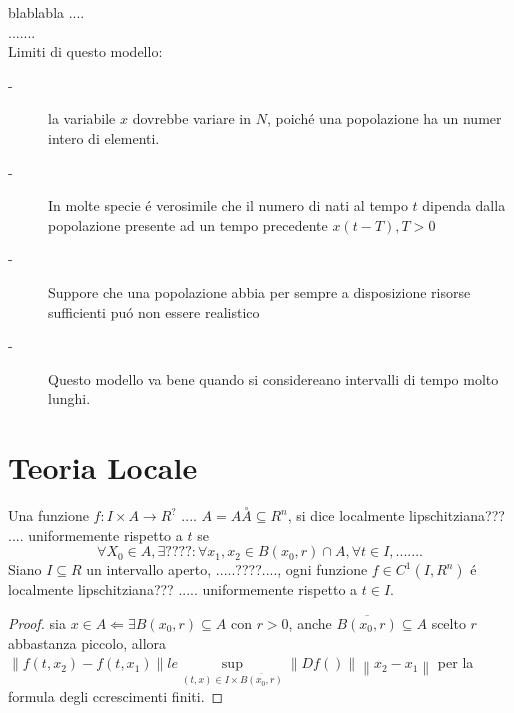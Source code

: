 blablabla ....\\
.......\\
Limiti di questo modello:
\begin{description}
	\item[-] la variabile $x$ dovrebbe variare in $N$, poich\'e una popolazione ha un numer intero di elementi.
	\item[-] In molte specie \'e verosimile che il numero di nati al tempo $t$ dipenda dalla popolazione presente ad un tempo precedente $x(t-T), T>0$
	\item[-] Suppore che una popolazione abbia per sempre a disposizione risorse sufficienti pu\'o non essere realistico
	\item[-] Questo modello va bene quando si considereano intervalli di tempo molto lunghi.
\end{description}

\section{Teoria Locale}
 Una funzione $f:I\times A\to R^{?}$ .... $A=A\overset{\circ}{A}\subseteq R^n$, si dice localmente lipschitziana??? .... uniformemente rispetto a $t$ se $$\forall X_0 \in A, \exists ???? : \forall x_1,x_2 \in B(x_0,r)\cap A, \forall t\in I, .......$$
\proposition
Siano $I\subseteq R$ un intervallo aperto, .....????...., ogni funzione $f\in C^1(I,R^n)$ \'e localmente lipschitziana??? ..... uniformemente rispetto a $t\in I$.
\begin{proof}
	sia $x\in A \Leftarrow \exists B(x_0,r)\subseteq A$ con $r>0$, anche $\overline{B(x_0,r)}\subseteq A$ scelto $r$ abbastanza piccolo, allora $\left\| f(t,x_2)-f(t,x_1)\right\|le\sup\limits_{(t,x)\in I\times \overline{B(x_0,r)}}\left\| Df() \right\|\left\| x_2-x_1 \right\|  $ per la formula degli ccrescimenti finiti.  
\end{proof}
